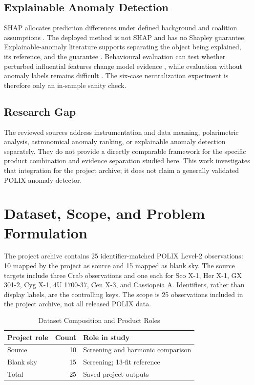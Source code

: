 \documentclass[conference]{IEEEtran}
\begin{document}
\subsection{Explainable Anomaly Detection}
SHAP allocates prediction differences under defined background and coalition assumptions \cite{lundberg2017shap}. The deployed method is not SHAP and has no Shapley guarantee. Explainable-anomaly literature supports separating the object being explained, its reference, and the guarantee \cite{li2024explainable_anomaly}. Behavioural evaluation can test whether perturbed influential features change model evidence \cite{yeh2019infidelity}, while evaluation without anomaly labels remains difficult \cite{campos2016evaluation}. The six-case neutralization experiment is therefore only an in-sample sanity check.

\subsection{Research Gap}
The reviewed sources address instrumentation and data meaning, polarimetric analysis, astronomical anomaly ranking, or explainable anomaly detection separately. They do not provide a directly comparable framework for the specific product combination and evidence separation studied here. This work investigates that integration for the project archive; it does not claim a generally validated POLIX anomaly detector.

\section{Dataset, Scope, and Problem Formulation}
The project archive contains 25 identifier-matched POLIX Level-2 observations: 10 mapped by the project as source and 15 mapped as blank sky. The source targets include three Crab observations and one each for Sco X-1, Her X-1, GX 301-2, Cyg X-1, 4U 1700-37, Cen X-3, and Cassiopeia A. Identifiers, rather than display labels, are the controlling keys. The scope is 25 observations included in the project archive, not all released POLIX data.

\begin{table}[t]
\caption{Dataset Composition and Product Roles}
\label{tab:data}
\centering
\begin{tabular}{lrl}
\toprule
Project role & Count & Role in study\\
\midrule
Source & 10 & Screening and harmonic comparison\\
Blank sky & 15 & Screening; 13-fit reference\\
Total & 25 & Saved project outputs\\
\bottomrule
\end{tabular}
\end{table}
\end{document}
